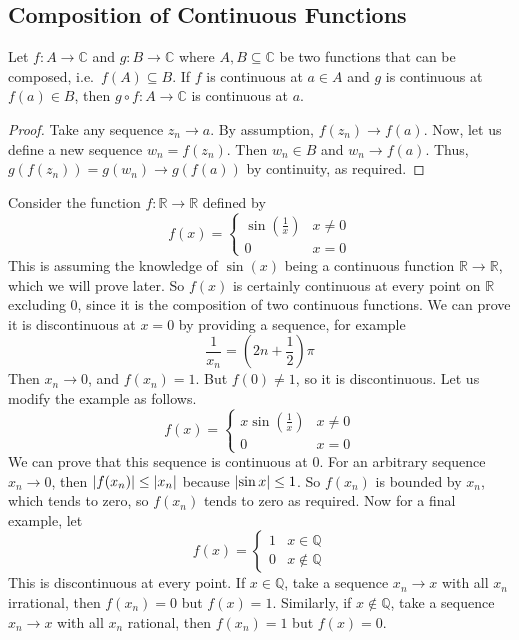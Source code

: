\subsection{Composition of Continuous Functions}
\begin{theorem}
	Let \(f \colon A \to \mathbb C\) and \(g \colon B \to \mathbb C\) where \(A, B \subseteq \mathbb C\) be two functions that can be composed, i.e.\ \(f(A) \subseteq B\).
	If \(f\) is continuous at \(a \in A\) and \(g\) is continuous at \(f(a) \in B\), then \(g \circ f \colon A \to \mathbb C\) is continuous at \(a\).
\end{theorem}
\begin{proof}
	Take any sequence \(z_n \to a\).
	By assumption, \(f(z_n) \to f(a)\).
	Now, let us define a new sequence \(w_n = f(z_n)\).
	Then \(w_n \in B\) and \(w_n \to f(a)\).
	Thus, \(g(f(z_n)) = g(w_n) \to g(f(a))\) by continuity, as required.
\end{proof}
\noindent Consider the function \(f\colon \mathbb R \to \mathbb R\) defined by
\[
	f(x) = \begin{cases}
		\sin\left( \frac{1}{x} \right) & x \neq 0 \\
		0                              & x = 0
	\end{cases}
\]
This is assuming the knowledge of \(\sin(x)\) being a continuous function \(\mathbb R\to \mathbb R\), which we will prove later.
So \(f(x)\) is certainly continuous at every point on \(\mathbb R\) excluding 0, since it is the composition of two continuous functions.
We can prove it is discontinuous at \(x=0\) by providing a sequence, for example
\[
	\frac{1}{x_n} = \left(2n + \frac{1}{2}\right)\pi
\]
Then \(x_n \to 0\), and \(f(x_n) = 1\).
But \(f(0) \neq 1\), so it is discontinuous.
Let us modify the example as follows.
\[
	f(x) = \begin{cases}
		x\sin\left( \frac{1}{x} \right) & x \neq 0 \\
		0                               & x = 0
	\end{cases}
\]
We can prove that this sequence is continuous at 0.
For an arbitrary sequence \(x_n \to 0\), then \(\abs{f(x_n)} \leq \abs{x_n}\) because \(\abs{\sin x} \leq 1\).
So \(f(x_n)\) is bounded by \(x_n\), which tends to zero, so \(f(x_n)\) tends to zero as required.
Now for a final example, let
\[
	f(x) = \begin{cases}
		1 & x \in \mathbb Q    \\
		0 & x \notin \mathbb Q
	\end{cases}
\]
This is discontinuous at every point.
If \(x \in \mathbb Q\), take a sequence \(x_n \to x\) with all \(x_n\) irrational, then \(f(x_n) = 0\) but \(f(x) = 1\).
Similarly, if \(x \notin \mathbb Q\), take a sequence \(x_n \to x\) with all \(x_n\) rational, then \(f(x_n) = 1\) but \(f(x) = 0\).
